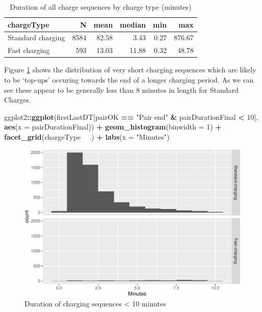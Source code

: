 \documentclass[]{article}
\newenvironment{Shaded}{\begin{snugshade}}{\end{snugshade}}
\newcommand{\KeywordTok}[1]{\textcolor[rgb]{0.13,0.29,0.53}{\textbf{#1}}}
\newcommand{\DataTypeTok}[1]{\textcolor[rgb]{0.13,0.29,0.53}{#1}}
\newcommand{\DecValTok}[1]{\textcolor[rgb]{0.00,0.00,0.81}{#1}}
\newcommand{\StringTok}[1]{\textcolor[rgb]{0.31,0.60,0.02}{#1}}
\newcommand{\OperatorTok}[1]{\textcolor[rgb]{0.81,0.36,0.00}{\textbf{#1}}}
\newcommand{\NormalTok}[1]{#1}
\begin{document}
\begin{table}[t]

\caption{\label{tab:durationDescTable}Duration of all charge sequences by charge type (minutes)}
\centering
\begin{tabular}{l|r|r|r|r|r}
\hline
chargeType & N & mean & median & min & max\\
\hline
Standard charging & 8584 & 82.58 & 3.43 & 0.27 & 876.67\\
\hline
Fast charging & 593 & 13.03 & 11.88 & 0.32 & 48.78\\
\hline
\end{tabular}
\end{table}

Figure \ref{fig:shortDuration} shows the distribution of very short
charging sequences which are likely to be `top-ups' occuring towards the
end of a longer charging period. As we can see these appear to be
generally less than 8 minutes in length for Standard Charges.

\begin{Shaded}
\begin{Highlighting}[]
\NormalTok{ggplot2}\OperatorTok{::}\KeywordTok{ggplot}\NormalTok{(firstLastDT[pairOK }\OperatorTok{==}\StringTok{ "Pair end"} \OperatorTok{&}\StringTok{ }\NormalTok{pairDurationFinal }\OperatorTok{<}\StringTok{ }\DecValTok{10}\NormalTok{], }
                \KeywordTok{aes}\NormalTok{(}\DataTypeTok{x =}\NormalTok{ pairDurationFinal)) }\OperatorTok{+}
\StringTok{  }\KeywordTok{geom_histogram}\NormalTok{(}\DataTypeTok{binwidth =} \DecValTok{1}\NormalTok{) }\OperatorTok{+}
\StringTok{  }\KeywordTok{facet_grid}\NormalTok{(chargeType }\OperatorTok{~}\StringTok{ }\NormalTok{.) }\OperatorTok{+}
\StringTok{  }\KeywordTok{labs}\NormalTok{(}\DataTypeTok{x =} \StringTok{"Minutes"}\NormalTok{)}
\end{Highlighting}
\end{Shaded}

\begin{figure}
\centering
\includegraphics{EVBB_SummaryReport_files/figure-latex/shortDuration-1.pdf}
\caption{\label{fig:shortDuration}Duration of charging sequences \textless{}
10 minutes}
\end{figure}
\end{document}
